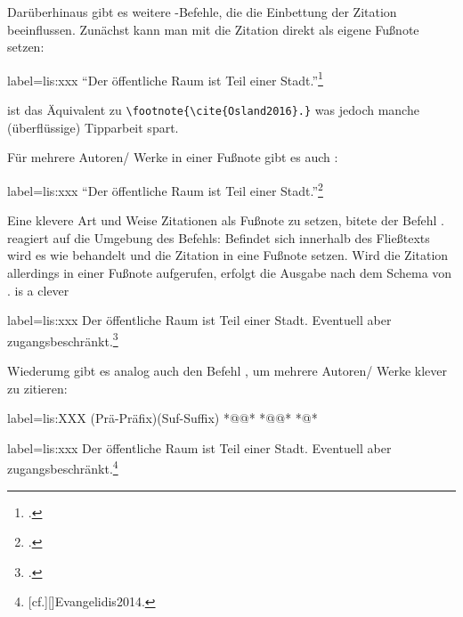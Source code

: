 Darüberhinaus gibt es weitere -Befehle, 
die die Einbettung der Zitation beeinflussen. 
Zunächst kann man mit  die Zitation direkt als eigene Fußnote setzen:
\begin{lfgwexample}{label={lis:xxx}}
\enquote{Der öffentliche Raum ist Teil einer Stadt.}\footcite{Osland2016}
\end{lfgwexample}
 ist das Äquivalent zu \lstinline/\footnote{\cite{Osland2016}.}/
was jedoch manche (überflüssige) Tipparbeit spart.

Für mehrere Autoren/ Werke in einer Fußnote gibt es auch :
\begin{lfgwexample}{label={lis:xxx}}
\enquote{Der öffentliche Raum ist Teil einer Stadt.}\footcites(s.)(){Osland2016}%
[vgl.][]{Evangelidis2014}
\end{lfgwexample}
 
 
Eine klevere Art und Weise Zitationen als Fußnote zu setzen,
bitete der Befehl .
  reagiert auf die Umgebung des Befehls:
 Befindet sich  innerhalb des Fließtexts wird es wie  behandelt 
 und die Zitation in eine Fußnote setzen. 
Wird die Zitation allerdings in einer Fußnote aufgerufen,
erfolgt die Ausgabe nach dem Schema von . 
 is a clever 

\begin{lfgwexample}{label={lis:xxx}}
Der öffentliche Raum ist Teil einer Stadt.\smartcite{Osland2016} 
Eventuell aber zugangsbeschränkt.\footnote{\smartcite[vgl.][]{Evangelidis2014}.}
\end{lfgwexample}


Wiederumg gibt es analog auch den Befehl , 
um mehrere Autoren/ Werke klever zu zitieren:
\begin{lfgwcode}{label={lis:XXX}}
\smartcites(Prä-Präfix)(Suf-Suffix)%
  *@@*%
  *@@*%
  *@\ldots@*
\end{lfgwcode}
\begin{lfgwexample}{label={lis:xxx}}
Der öffentliche Raum ist Teil einer Stadt. 
Eventuell aber zugangsbeschränkt.\footnote{%
[cf.][]{Evangelidis2014}.}
\end{lfgwexample}

